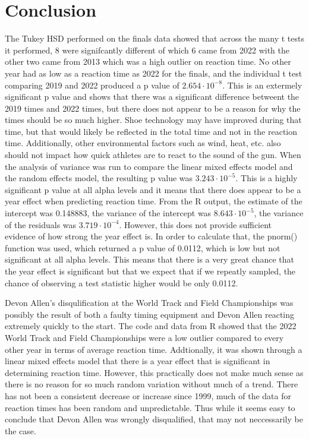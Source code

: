 \documentclass[12pt, letterpaper, titlepage]{article}
\begin{document}
\section{Conclusion}
\label{sec:conclusion}
The Tukey HSD performed on the finals data showed that across the many t tests it
performed, 8 were signifcantly different of which 6 came from 2022 with the other
two came from 2013 which was a high outlier on reaction time.  No other year had
as low as a reaction time as 2022 for the finals, and the individual t test
comparing 2019 and 2022 produced a p value of $2.654\cdot10^{-8}$.  This is an
extermely significant p value and shows that there was a significant difference
betweent the 2019 times and 2022 times, but there does not appear to be a reason
for why the times should be so much higher.  Shoe technology may have improved
during that time, but that would likely be reflected in the total time and not
in the reaction time.  Additionally, other environmental factors such as wind,
heat, etc. also should not impact how quick athletes are to react to the sound
of the gun.  When the analysis of variance was run to compare the linear mixed
effects model and the random effects model, the resulting p value was $3.243\cdot10^{-5}$.
This is a highly significant p value at all alpha levels and it means that there
does appear to be a year effect when predicting reaction time.  From the R output,
the estimate of the intercept was 0.148883, the variance of the intercept was
$8.643\cdot10^{-5}$, the variance of the residuals was $3.719\cdot10^{-4}$.
However, this does not provide sufficient evidence of how strong the year effect
is.  In order to calculate that, the pnorm() function was used, which returned
a p value of 0.0112, which is low but not significant at all alpha levels.  This
means that there is a very great chance that the year effect is significant but
that we expect that if we repeatly sampled, the chance of observing a test
statistic higher would be only 0.0112.  

Devon Allen's disqulification at the World Track and Field Championships was
possibly the result of both a faulty timing equipment and Devon Allen
reacting extremely quickly to the start.  The code and data from R showed that
the 2022 World Track and Field Championships were a low outlier compared to
every other year in terms of average reaction time.  Addtionally, it was shown
through a linear mixed effects model that there is a year effect that is significant
in determining reaction time.  However, this practically does not make much sense
as there is no reason for so much random variation without much of a trend.
There has not been a consistent decrease or increase since 1999, much of the data
for reaction times has been random and unpredictable.  Thus while it seems easy
to conclude that Devon Allen was wrongly disqualified, that may not neccessarily
be the case.
\end{document}

